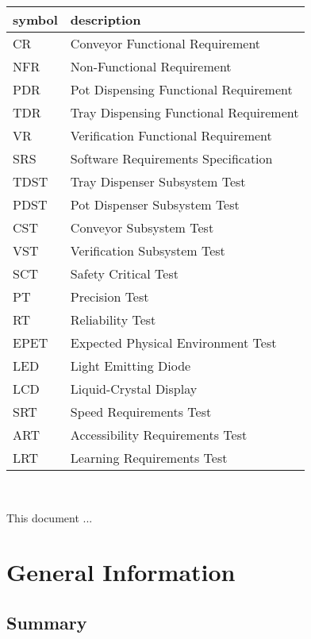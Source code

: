 \documentclass[12pt, titlepage]{article}
\begin{document}
\renewcommand{\arraystretch}{1.2}
\begin{tabular}{l l} 
  \toprule		
  \textbf{symbol} & \textbf{description}\\
  \midrule 
  CR & Conveyor Functional Requirement\\
  NFR & Non-Functional Requirement\\
  PDR & Pot Dispensing Functional Requirement\\
  TDR & Tray Dispensing Functional Requirement\\
  VR & Verification Functional Requirement\\
  SRS & Software Requirements Specification\\
  TDST & Tray Dispenser Subsystem Test\\
  PDST & Pot Dispenser Subsystem Test\\
  CST & Conveyor Subsystem Test\\
  VST & Verification Subsystem Test\\
  SCT & Safety Critical Test\\
  PT & Precision Test\\
  RT & Reliability Test\\
  EPET & Expected Physical Environment Test\\
  LED & Light Emitting Diode\\
  LCD & Liquid-Crystal Display\\
  SRT & Speed Requirements Test\\
  ART & Accessibility Requirements Test\\
  LRT & Learning Requirements Test\\

  \bottomrule
\end{tabular}\\



\newpage


This document ... 

\section{General Information}

\subsection{Summary}
\end{document}
